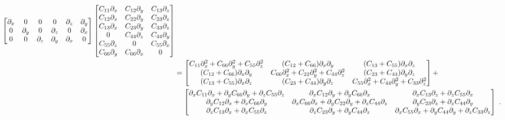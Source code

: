 \begin{eqnarray}
\begin{bmatrix}
        \partial_x & 0 & 0 & 0 & \partial_z & \partial_y \\
        0 & \partial_y & 0 & \partial_z & 0 & \partial_x \\
        0 & 0 & \partial_z & \partial_y & \partial_x & 0
    \end{bmatrix}
    \begin{bmatrix}
        C_{11}\partial_x & C_{12}\partial_y & C_{13}\partial_z \\
        C_{12}\partial_x & C_{22}\partial_y & C_{23}\partial_z \\
        C_{13}\partial_x & C_{23}\partial_y & C_{33}\partial_z \\
        0                & C_{44}\partial_z & C_{44}\partial_y \\
        C_{55}\partial_z & 0                & C_{55}\partial_x \\
        C_{66}\partial_y & C_{66}\partial_x & 0      
    \end{bmatrix} \\ \nonumber
    &=
    \begin{bmatrix}
        C_{11}\partial_x^2+C_{66}\partial_y^2+C_{55}\partial_z^2 & (C_{12}+C_{66})\partial_x\partial_y & (C_{13}+C_{55})\partial_x\partial_z \\
        (C_{12}+C_{66})\partial_x\partial_y & C_{66}\partial_x^2+C_{22}\partial_y^2+C_{44}\partial_z^2 & (C_{23}+C_{44})\partial_y\partial_z  \\
        (C_{13}+C_{55})\partial_x\partial_z & (C_{23}+C_{44})\partial_y\partial_z & C_{55}\partial_x^2+C_{44}\partial_y^2+C_{33}\partial_z^2
    \end{bmatrix} + \\ \nonumber
    &\ \hphantom{=}
    \begin{bmatrix}
        \partial_xC_{11}\partial_x+\partial_yC_{66}\partial_y+\partial_zC_{55}\partial_z & \partial_xC_{12}\partial_y+\partial_yC_{66}\partial_x & \partial_xC_{13}\partial_z+\partial_zC_{55}\partial_x \\
        \partial_yC_{12}\partial_x+\partial_xC_{66}\partial_y & \partial_xC_{66}\partial_x+\partial_yC_{22}\partial_y+\partial_zC_{44}\partial_z & \partial_yC_{23}\partial_z+\partial_zC_{44}\partial_y \\
        \partial_zC_{13}\partial_x+\partial_xC_{55}\partial_z & \partial_zC_{23}\partial_y+\partial_yC_{44}\partial_z & \partial_xC_{55}\partial_x+\partial_yC_{44}\partial_y+\partial_zC_{33}\partial_z
    \end{bmatrix}
    \;.
\end{eqnarray}

